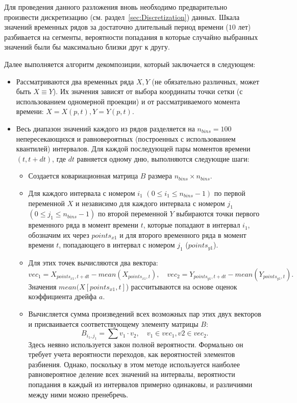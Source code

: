 Для проведения данного разложения вновь необходимо предварительно произвести дискретизацию (см. раздел~\ref{sec:Discretization}) данных. Шкала значений временных рядов за достаточно длительный период времени ($10$ лет) разбивается на сегменты, вероятности попадания в которые случайно выбранных значений были бы максимально близки друг к другу. 

Далее выполняется алгоритм декомпозиции, который заключается в следующем:
\begin{itemize}
	\item Рассматриваются два временных ряда $X,Y$ (не обязательно различных, может быть $X \equiv Y$). Их значения зависят от выбора координаты точки сетки (с использованием одномерной проекции) и от рассматриваемого момента времени: $X=X(p,t), Y=Y(p,t)$. 
	\item Весь диапазон значений каждого из рядов разделяется на $n_{bins}=100$ непересекающихся и равновероятных (построенных с использованием квантилей) интервалов. Для каждой последующей пары моментов времени $(t,t+dt)$, где $dt$ равняется одному дню, выполняются следующие шаги:
	\begin{itemize}
		\item Создается ковариационная матрица $B$ размера $n_{bins} \times n_{bins}$.
		
		\item Для каждого интервала с номером $i_1$ $(0 \leqslant i_1 \leqslant n_{bins}-1)$ по первой переменной $X$ и независимо для каждого интервала с номером $j_1$ $(0 \leqslant j_1 \leqslant n_{bins}-1)$ по второй переменной $Y$ выбираются точки первого временного ряда в момент времени $t$, которые попадают в интервал $i_1$, обозначим их через $points_{x1}$ и для второго временного ряда в момент времени $t$, попадающего в интервал с номером $j_1$ ($points_{y1}$).
		
		\item Для этих точек вычисляются два вектора:
		\begin{equation*}
			vec_1 = X_{points_{x1},t+dt} - mean(X_{points_{x1},t}),\quad
			vec_2 = Y_{points_{y1},t+dt} - mean(Y_{points_{y1},t}).
		\end{equation*}
		Значения $mean(X[points_{x1},t]$) рассчитываются на основе оценок коэффициента дрейфа $a$.
		
		\item Вычисляется сумма произведений всех возможных пар этих двух векторов и присваивается соответствующему элементу матрицы $B$:
		\begin{equation*}
			B_{i_1, j_1} = \sum v_1 \cdot v_2, \quad v_1 \in vec_1, v2 \in vec_2.
		\end{equation*}
		Здесь неявно используется закон полной вероятности. Формально он требует учета вероятности переходов, как вероятностей элементов разбиения. Однако, поскольку в этом методе используется наиболее равновероятное деление всех значений на интервалы, вероятности попадания в каждый из интервалов примерно одинаковы, и различиями между ними можно пренебречь. %
		

\end{itemize}
\end{itemize}
